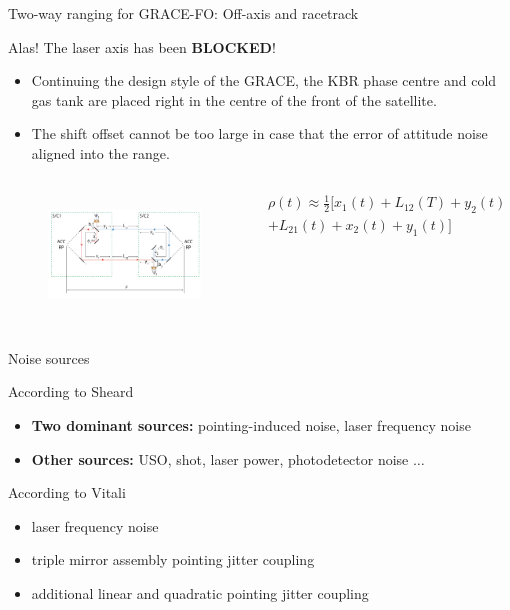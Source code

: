 \documentclass[12pt,english,ignorenonframetext,]{beamer}
\begin{document}
\begin{frame}{Two-way ranging for GRACE-FO: Off-axis and racetrack}
	\begin{block}{Alas! The laser axis has been \textbf{BLOCKED}!}
		\begin{itemize}
			\item Continuing the design style of the GRACE, the KBR phase centre and cold gas tank are placed right in the centre of the front of the satellite.
			\item The shift offset cannot be too large in case that the error of attitude noise aligned into the range.
		\end{itemize}
		\begin{columns}
			\column{6cm}
			\begin{figure}
				\includegraphics[height=3.3cm]{..//images//two_way_range_gracefo.png}
			\end{figure}
			\column{5cm}
			\begin{scriptsize}
				\begin{equation}
				\begin{split}
				\rho \left( t \right) \approx \frac{1}{2} [ x_1\left( t \right) +L_{12}\left( T \right) 
				 +y_2\left( t \right)\\
				  +L_{21}\left( t \right) 
				  +x_2\left( t \right) +y_1\left( t \right) ] 
				\end{split}
				\end{equation}
			\end{scriptsize}
		\end{columns}
		
	\end{block}
\end{frame}

\begin{frame}{Noise sources}
	\begin{block}{According to Sheard}
		\begin{itemize}
			\item \textbf{Two dominant sources:} pointing-induced noise, laser frequency noise
			\item \textbf{Other sources:} USO, shot, laser power, photodetector noise $\dots$
		\end{itemize}
	\end{block}

	\begin{block}{According to Vitali}
		\begin{itemize}
			\item laser frequency noise
			\item triple mirror assembly pointing jitter coupling
			\item additional linear and quadratic pointing jitter coupling
		\end{itemize}
	\end{block}
\end{frame}
\end{document}
